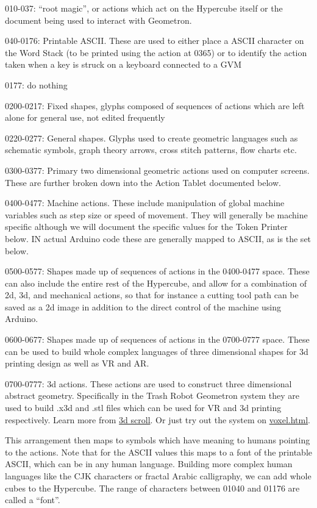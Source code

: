 010-037: ``root magic'', or actions which act on the Hypercube itself or
the document being used to interact with Geometron.

040-0176: Printable ASCII. These are used to either place a ASCII
character on the Word Stack (to be printed using the action at 0365) or
to identify the action taken when a key is struck on a keyboard
connected to a GVM

0177: do nothing

0200-0217: Fixed shapes, glyphs composed of sequences of actions which
are left alone for general use, not edited frequently

0220-0277: General shapes. Glyphs used to create geometric languages
such as schematic symbols, graph theory arrows, cross stitch patterns,
flow charts etc.

0300-0377: Primary two dimensional geometric actions used on computer
screens. These are further broken down into the Action Tablet documented
below.

0400-0477: Machine actions. These include manipulation of global machine
variables such as step size or speed of movement. They will generally be
machine specific although we will document the specific values for the
Token Printer below. IN actual Arduino code these are generally mapped
to ASCII, as is the set below.

0500-0577: Shapes made up of sequences of actions in the 0400-0477
space. These can also include the entire rest of the Hypercube, and
allow for a combination of 2d, 3d, and mechanical actions, so that for
instance a cutting tool path can be saved as a 2d image in addition to
the direct control of the machine using Arduino.

0600-0677: Shapes made up of sequences of actions in the 0700-0777
space. These can be used to build whole complex languages of three
dimensional shapes for 3d printing design as well as VR and AR.

0700-0777: 3d actions. These actions are used to construct three
dimensional abstract geometry. Specifically in the Trash Robot Geometron
system they are used to build .x3d and .stl files which can be used for
VR and 3d printing respectively. Learn more from
\href{scrolls/geometron3d}{3d scroll}. Or just try out the system on
\url{voxel.html}.

This arrangement then maps to symbols which have meaning to humans
pointing to the actions. Note that for the ASCII values this maps to a
font of the printable ASCII, which can be in any human language.
Building more complex human languages like the CJK characters or fractal
Arabic calligraphy, we can add whole cubes to the Hypercube. The range
of characters between 01040 and 01176 are called a ``font''.

